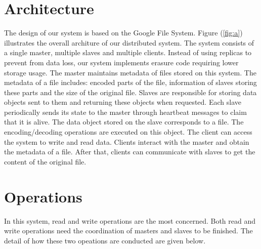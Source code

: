 \documentclass[conference]{IEEEtran}
\begin{document}




%
\IEEEpeerreviewmaketitle

\section{Architecture}
The design of our system is based on the Google File System\cite{gfs}. Figure (\ref{fig:a}) illustrates the overall architure of our distributed system.
The system consists of a single master, multiple slaves and  multiple clients. Instead of using replicas to prevent from data loss, our system implements erasure code requiring lower storage usage. The master maintains metadata of files stored on this system. The metadata of a file includes: encoded parts of the file, information of slaves storing these parts and the size of the original file. Slaves are responsible for storing data objects sent to them and returning these objects when requested. Each slave periodically sends its state to the master through heartbeat messages to claim that it is alive. The data object stored on the slave corresponds to a file. The encoding/decoding operations are executed on this object. The client can access the system to write and read data.
Clients interact with the master and obtain the metadata of a file. After that, clients can communicate with slaves to get the content of the original file.

\section{Operations}
In this system, read and write operations are the most concerned. Both read and write operations need the coordination of masters and slaves to be finished. The detail of how these two opeations are conducted are given below.
\end{document}
